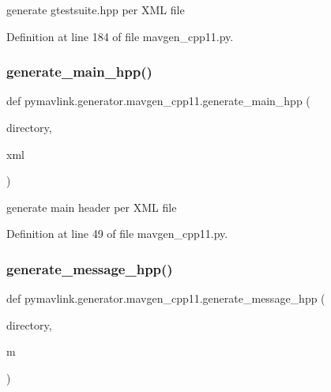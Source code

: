 \begin{DoxyVerb}generate gtestsuite.hpp per XML file\end{DoxyVerb}
 

Definition at line 184 of file mavgen\+\_\+cpp11.\+py.

\mbox{\label{namespacepymavlink_1_1generator_1_1mavgen__cpp11_a8588e20abc9c34779923fda932483ace}} 
\subsubsection{\texorpdfstring{generate\_main\_hpp()}{generate\_main\_hpp()}}
{\footnotesize\ttfamily def pymavlink.\+generator.\+mavgen\+\_\+cpp11.\+generate\+\_\+main\+\_\+hpp (\begin{DoxyParamCaption}\item[{}]{directory,  }\item[{}]{xml }\end{DoxyParamCaption})}

\begin{DoxyVerb}generate main header per XML file\end{DoxyVerb}
 

Definition at line 49 of file mavgen\+\_\+cpp11.\+py.

\mbox{\label{namespacepymavlink_1_1generator_1_1mavgen__cpp11_a45ff369d71421e11a26c7a69c2f8de6c}} 
\subsubsection{\texorpdfstring{generate\_message\_hpp()}{generate\_message\_hpp()}}
{\footnotesize\ttfamily def pymavlink.\+generator.\+mavgen\+\_\+cpp11.\+generate\+\_\+message\+\_\+hpp (\begin{DoxyParamCaption}\item[{}]{directory,  }\item[{}]{m }\end{DoxyParamCaption})}

